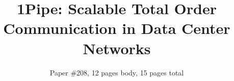\documentclass[sigconf]{acmart}
\numberwithin{equation}{section}
\begin{document}
\renewcommand\footnotetextcopyrightpermission[1]{} %


\acmDOI{}

\acmISBN{}


\acmPrice{}

\date{}

\title{1Pipe: Scalable Total Order Communication in Data Center Networks}

\author{Paper \#208, 12 pages body, 15 pages total}

\renewcommand{\shortauthors}{X.et al.}

\maketitle














{\footnotesize

}

\appendix

\end{document}
